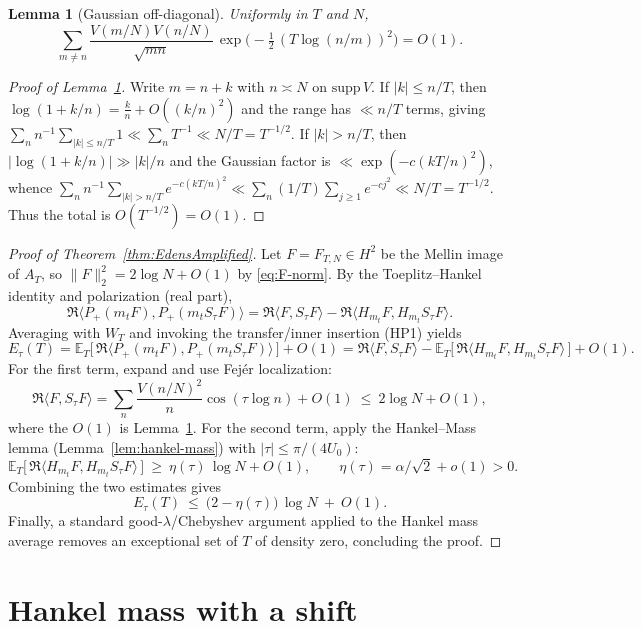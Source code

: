 \documentclass[11pt]{article}
\theoremstyle{plain}
\newtheorem{lemma}[theorem]{Lemma}
\theoremstyle{definition}
\numberwithin{equation}{section}
\begin{document}
\begin{lemma}[Gaussian off-diagonal]\label{lem:gauss-offdiag}
Uniformly in $T$ and $N$,
\[
\sum_{m\neq n}\frac{V(m/N)V(n/N)}{\sqrt{mn}}\,
\exp\!\Big(-\tfrac12\,(T\log(n/m))^2\Big)=O(1).
\]
\end{lemma}

\begin{proof}[Proof of Lemma~\ref{lem:gauss-offdiag}]
Write $m=n+k$ with $n\asymp N$ on $\mathrm{supp}\,V$. If $|k|\le n/T$, then
$\log(1+k/n)=\tfrac{k}{n}+O((k/n)^2)$ and the range has $\ll n/T$ terms, giving
$\sum_n n^{-1}\sum_{|k|\le n/T}1\ll \sum_n T^{-1}\ll N/T=T^{-1/2}$.
If $|k|>n/T$, then $|\log(1+k/n)|\gg |k|/n$ and the Gaussian factor is $\ll \exp(-c(kT/n)^2)$, whence
$\sum_n n^{-1}\sum_{|k|>n/T}e^{-c(kT/n)^2}\ll \sum_n (1/T)\sum_{j\ge1}e^{-c j^2}\ll N/T=T^{-1/2}$.
Thus the total is $O(T^{-1/2})=O(1)$.
\end{proof}

\begin{proof}[Proof of Theorem~\ref{thm:EdensAmplified}]
Let $F=F_{T,N}\in H^2$ be the Mellin image of $A_T$, so $\|F\|_2^2=2\log N+O(1)$ by \eqref{eq:F-norm}.
By the Toeplitz--Hankel identity and polarization (real part),
\[
\Re\langle P_+(m_tF),P_+(m_tS_\tau F)\rangle
=\Re\langle F,S_\tau F\rangle-\Re\langle H_{m_t}F, H_{m_t}S_\tau F\rangle .
\]
Averaging with $W_T$ and invoking the transfer/inner insertion (HP1) yields
\begin{equation*}
E_\tau(T)
= \mathbb E_T\!\big[\,\Re\langle P_+(m_tF),P_+(m_tS_\tau F)\rangle\,\big] + O(1)
= \Re\langle F,S_\tau F\rangle - \mathbb E_T\!\big[\,\Re\langle H_{m_t}F,H_{m_t}S_\tau F\rangle\,\big] + O(1).
\end{equation*}
For the first term, expand and use Fejér localization:
\[
\Re\langle F,S_\tau F\rangle
=\sum_{n}\frac{V(n/N)^2}{n}\cos(\tau\log n)+O(1)\ \le\ 2\log N+O(1),
\]
where the $O(1)$ is Lemma~\ref{lem:gauss-offdiag}. For the second term, apply the Hankel--Mass lemma
(Lemma~\ref{lem:hankel-mass}) with $|\tau|\le \pi/(4U_0)$:
\[
\mathbb E_T\!\big[\,\Re\langle H_{m_t}F,H_{m_t}S_\tau F\rangle\,\big]\ \ge\ \eta(\tau)\,\log N + O(1),
\qquad \eta(\tau)=\alpha/\sqrt{2}+o(1)>0.
\]
Combining the two estimates gives
\[
E_\tau(T)\ \le\ \big(2-\eta(\tau)\big)\,\log N\ +\ O(1).
\]
Finally, a standard good-$\lambda$/Chebyshev argument applied to the Hankel mass average removes an exceptional set of $T$ of density zero, concluding the proof.
\end{proof}

\section{Hankel mass with a shift}
\end{document}
